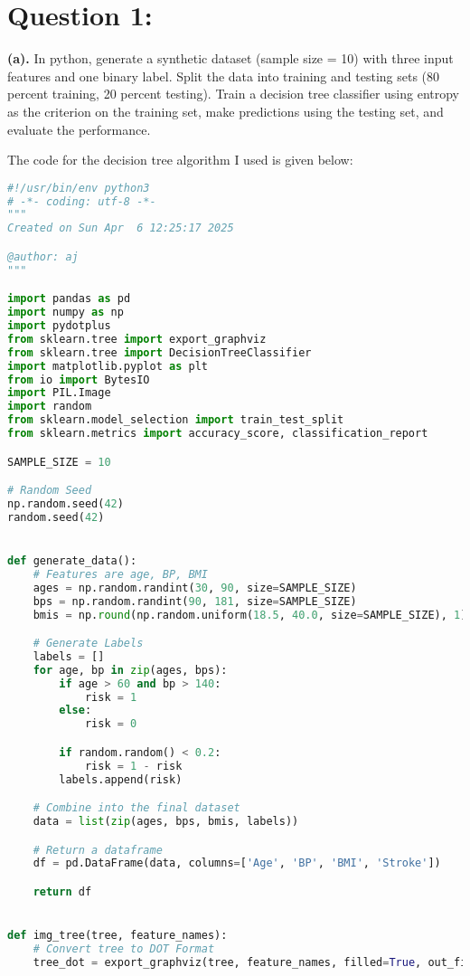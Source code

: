 \documentclass[12pt,letterpaper]{article}
\begin{document}
\sloppy

\section*{Question 1:}
\textbf{(a).} In python, generate a synthetic dataset (sample size = 10) with three input features and one binary
label. Split the data into training and testing sets (80 percent training, 20 percent testing). Train a decision
tree classifier using entropy as the criterion on the training set, make predictions using the testing
set, and evaluate the performance.

\vspace{.2in}

The code for the decision tree algorithm I used is given below:
\begin{lstlisting}[language=Python, breaklines=true, columns=flexible, frame=single]
    #!/usr/bin/env python3
# -*- coding: utf-8 -*-
"""
Created on Sun Apr  6 12:25:17 2025

@author: aj
"""

import pandas as pd
import numpy as np
import pydotplus
from sklearn.tree import export_graphviz
from sklearn.tree import DecisionTreeClassifier
import matplotlib.pyplot as plt
from io import BytesIO
import PIL.Image
import random
from sklearn.model_selection import train_test_split
from sklearn.metrics import accuracy_score, classification_report

SAMPLE_SIZE = 10

# Random Seed
np.random.seed(42)
random.seed(42)


def generate_data():
    # Features are age, BP, BMI
    ages = np.random.randint(30, 90, size=SAMPLE_SIZE)
    bps = np.random.randint(90, 181, size=SAMPLE_SIZE)
    bmis = np.round(np.random.uniform(18.5, 40.0, size=SAMPLE_SIZE), 1)

    # Generate Labels
    labels = []
    for age, bp in zip(ages, bps):
        if age > 60 and bp > 140:
            risk = 1
        else:
            risk = 0

        if random.random() < 0.2:
            risk = 1 - risk
        labels.append(risk)

    # Combine into the final dataset
    data = list(zip(ages, bps, bmis, labels))

    # Return a dataframe
    df = pd.DataFrame(data, columns=['Age', 'BP', 'BMI', 'Stroke'])

    return df


def img_tree(tree, feature_names):
    # Convert tree to DOT Format
    tree_dot = export_graphviz(tree, feature_names, filled=True, out_file=None)


\end{lstlisting}
\end{document}

